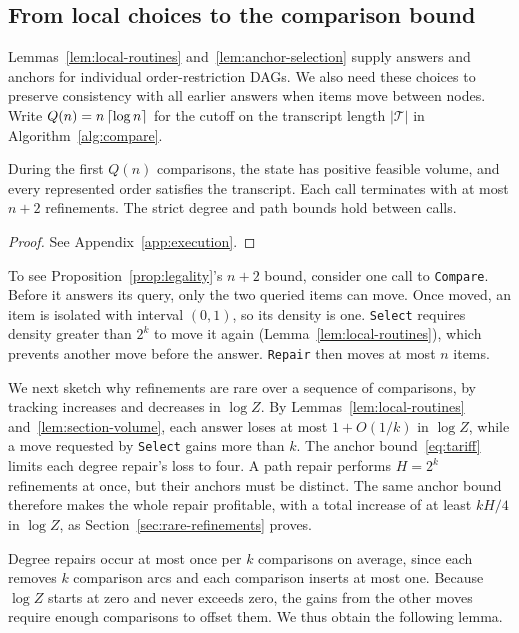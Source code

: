 \subsection{From local choices to the comparison bound}\label{sec:operation-properties}

Lemmas~\ref{lem:local-routines} and~\ref{lem:anchor-selection}
supply answers and anchors for individual order-restriction DAGs. We also need these choices to preserve consistency
with all earlier answers when items move between nodes. Write
$Q(n)=n\left\lceil \log n\right\rceil$ for the cutoff on the transcript length
$|\mathcal T|$ in Algorithm~\ref{alg:compare}.

\begin{proposition}\label{prop:legality}
During the first $Q(n)$ comparisons, the state has positive feasible volume,
and every represented order satisfies the transcript. Each call
terminates with at most $n+2$ refinements. The strict degree and path
bounds hold between calls.
\end{proposition}
\begin{proof}
See Appendix~\ref{app:execution}.
\end{proof}

To see Proposition~\ref{prop:legality}'s $n+2$ bound, consider one call to \texttt{Compare}.
Before it answers its query, only the two queried items can move. Once moved, an
item is isolated with interval $(0,1)$, so its density is one.
\texttt{Select} requires density greater than $2^k$ to move it again
(Lemma~\ref{lem:local-routines}), which prevents another move before the
answer. \texttt{Repair} then moves at most
$n$ items.

We next sketch why refinements are rare over a sequence of comparisons,
by tracking increases and decreases in $\log Z$.
By Lemmas~\ref{lem:local-routines} and~\ref{lem:section-volume}, each
answer loses at most $1+O(1/k)$ in $\log Z$, while a move requested by
\texttt{Select} gains more than $k$. The anchor bound~\eqref{eq:tariff}
limits each degree repair's loss to four. A path repair performs
$H=2^k$ refinements at once, but their anchors must be distinct.
The same anchor bound therefore makes the whole repair profitable,
with a total increase of at least $kH/4$ in $\log Z$, as
Section~\ref{sec:rare-refinements} proves.

Degree repairs occur at most
once per $k$ comparisons on average, since each removes $k$ comparison
arcs and each comparison inserts at most one. Because $\log Z$ starts at
zero and never exceeds zero, the gains
from the other moves require enough comparisons to offset them.
We thus obtain the following lemma.


